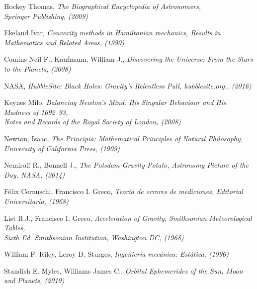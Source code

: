 \documentclass[a4paper,twocolumn]{article}
\begin{document}
\begin{thebibliography}{99}

     Hockey Thomas, \emph{The Biographical Encyclopedia of Astronomers,\\ Springer Publishing, (2009)}

     Ekeland Ivar, \emph{Convexity methods in Hamiltonian mechanics, Results in Mathematics and Related Areas, (1990)}

     Comins Neil F., Kaufmann, William J., \emph{Discovering the Universe: From the Stars to the Planets, (2008)}

     NASA, \emph{HubbleSite: Black Holes: Gravity's Relentless Pull, hubblesite.org., (2016)}

     Keynes Milo, \emph{Balancing Newton's Mind: His Singular Behaviour and His Madness of 1692--93,\\ Notes and Records of the Royal Society of London, (2008)}

     Newton, Isaac, \emph{The Principia: Mathematical Principles of Natural Philosophy, University of California Press, (1999)}

     Nemiroff R., Bonnell J., \emph{The Potsdam Gravity Potato, Astronomy Picture of the Day, NASA, (2014)}

     Félix Cernuschi, Francisco I. Greco, \emph{Teoría de errores de mediciones, Editorial Universitaria, (1968)}

     List R.J., Francisco I. Greco, \emph{Acceleration of Gravity, Smithsonian Meteorological Tables,\\ Sixth Ed. Smithsonian Institution, Washington DC, (1968)}

     William F. Riley, Leroy D. Sturges, \emph{Ingeniería mecánica: Estática, (1996)}

     Standish E. Myles, Williams James C., \emph{Orbital Ephemerides of the Sun, Moon and Planets, (2010)}

\end{thebibliography}
\end{document}
